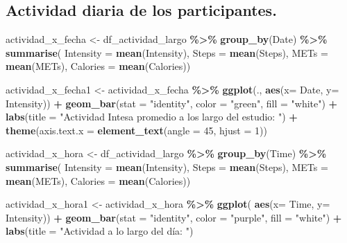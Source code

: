 \documentclass[
]{article}
\newenvironment{Shaded}{\begin{snugshade}}{\end{snugshade}}
\newcommand{\AttributeTok}[1]{\textcolor[rgb]{0.13,0.29,0.53}{#1}}
\newcommand{\DecValTok}[1]{\textcolor[rgb]{0.00,0.00,0.81}{#1}}
\newcommand{\FunctionTok}[1]{\textcolor[rgb]{0.13,0.29,0.53}{\textbf{#1}}}
\newcommand{\NormalTok}[1]{#1}
\newcommand{\OtherTok}[1]{\textcolor[rgb]{0.56,0.35,0.01}{#1}}
\newcommand{\SpecialCharTok}[1]{\textcolor[rgb]{0.81,0.36,0.00}{\textbf{#1}}}
\newcommand{\StringTok}[1]{\textcolor[rgb]{0.31,0.60,0.02}{#1}}
\begin{document}
\subsection{Actividad diaria de los
participantes.}\label{actividad-diaria-de-los-participantes.}

\begin{Shaded}
\begin{Highlighting}[]
\NormalTok{actividad\_x\_fecha }\OtherTok{\textless{}{-}}\NormalTok{ df\_actividad\_largo }\SpecialCharTok{\%\textgreater{}\%} \FunctionTok{group\_by}\NormalTok{(Date) }\SpecialCharTok{\%\textgreater{}\%} 
  \FunctionTok{summarise}\NormalTok{( }\AttributeTok{Intensity =} \FunctionTok{mean}\NormalTok{(Intensity),}
             \AttributeTok{Steps =} \FunctionTok{mean}\NormalTok{(Steps),}
             \AttributeTok{METs =} \FunctionTok{mean}\NormalTok{(METs),}
             \AttributeTok{Calories =} \FunctionTok{mean}\NormalTok{(Calories))}

\NormalTok{actividad\_x\_fecha1 }\OtherTok{\textless{}{-}}\NormalTok{  actividad\_x\_fecha }\SpecialCharTok{\%\textgreater{}\%} \FunctionTok{ggplot}\NormalTok{(., }\FunctionTok{aes}\NormalTok{(}\AttributeTok{x=}\NormalTok{ Date, }\AttributeTok{y=}\NormalTok{ Intensity)) }\SpecialCharTok{+} \FunctionTok{geom\_bar}\NormalTok{(}\AttributeTok{stat =} \StringTok{"identity"}\NormalTok{, }\AttributeTok{color =} \StringTok{"green"}\NormalTok{, }\AttributeTok{fill =} \StringTok{"white"}\NormalTok{) }\SpecialCharTok{+} \FunctionTok{labs}\NormalTok{(}\AttributeTok{title =} \StringTok{"Actividad Intesa promedio a los largo del estudio: "}\NormalTok{) }\SpecialCharTok{+} \FunctionTok{theme}\NormalTok{(}\AttributeTok{axis.text.x =} \FunctionTok{element\_text}\NormalTok{(}\AttributeTok{angle =} \DecValTok{45}\NormalTok{, }\AttributeTok{hjust =} \DecValTok{1}\NormalTok{))}

\NormalTok{actividad\_x\_hora }\OtherTok{\textless{}{-}}\NormalTok{ df\_actividad\_largo }\SpecialCharTok{\%\textgreater{}\%} \FunctionTok{group\_by}\NormalTok{(Time) }\SpecialCharTok{\%\textgreater{}\%} 
  \FunctionTok{summarise}\NormalTok{( }\AttributeTok{Intensity =} \FunctionTok{mean}\NormalTok{(Intensity),}
             \AttributeTok{Steps =} \FunctionTok{mean}\NormalTok{(Steps),}
             \AttributeTok{METs =} \FunctionTok{mean}\NormalTok{(METs),}
             \AttributeTok{Calories =} \FunctionTok{mean}\NormalTok{(Calories))}

\NormalTok{actividad\_x\_hora1 }\OtherTok{\textless{}{-}}\NormalTok{  actividad\_x\_hora }\SpecialCharTok{\%\textgreater{}\%} \FunctionTok{ggplot}\NormalTok{( }\FunctionTok{aes}\NormalTok{(}\AttributeTok{x=}\NormalTok{ Time, }\AttributeTok{y=}\NormalTok{ Intensity)) }\SpecialCharTok{+} \FunctionTok{geom\_bar}\NormalTok{(}\AttributeTok{stat =} \StringTok{"identity"}\NormalTok{, }\AttributeTok{color =} \StringTok{"purple"}\NormalTok{, }\AttributeTok{fill =} \StringTok{"white"}\NormalTok{) }\SpecialCharTok{+} \FunctionTok{labs}\NormalTok{(}\AttributeTok{title =} \StringTok{"Actividad a lo largo del día: "}\NormalTok{)}
      

\end{Highlighting}
\end{Shaded}
\end{document}
